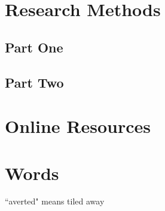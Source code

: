 \documentclass[12pt]{article}
\begin{document}
\newpage

 


\appendix

\section{Research Methods}

\subsection{Part One}



\subsection{Part Two}


\section{Online Resources}


\section{Words}
``averted" means tiled away
\end{document}
